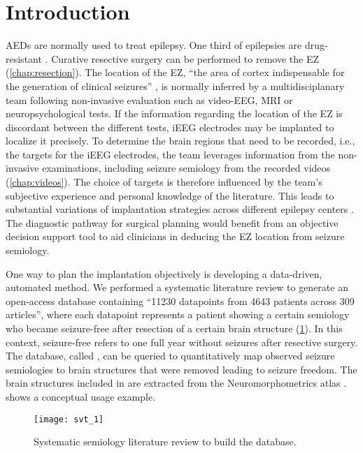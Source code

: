 \section{Introduction}

\Acp{AED} are normally used to treat epilepsy.
One third of epilepsies are drug-resistant \cite{engel_what_2016}.
Curative resective surgery can be performed to remove the \ac{EZ} (\cref{chap:resection}).
The location of the \ac{EZ}, ``the area of cortex indispensable for the generation of clinical seizures'' \cite{rosenow_presurgical_2001}, is normally inferred by a multidisciplanary team following non-invasive evaluation such as video-\ac{EEG}, \ac{MRI} or neuropsychological tests.
If the information regarding the location of the \ac{EZ} is discordant between the different tests, \ac{iEEG} electrodes may be implanted to localize it precisely.
To determine the brain regions that need to be recorded, i.e., the targets for the \ac{iEEG} electrodes, the team leverages information from the non-invasive examinations, including seizure semiology from the recorded videos (\cref{chap:videos}).
The choice of targets is therefore influenced by the team's subjective experience and personal knowledge of the literature.
This leads to substantial variations of implantation strategies across different epilepsy centers \cite{tufenkjian_seizure_2012}.
The diagnostic pathway for surgical planning would benefit from an objective decision support tool to aid clinicians in deducing the \ac{EZ} location from seizure semiology.

One way to plan the implantation objectively is developing a data-driven, automated method.
We performed a systematic literature review to generate an open-access database containing ``11230 datapoints from 4643 patients across 309 articles'', where each datapoint represents a patient showing a certain semiology who became seizure-free after resection of a certain brain structure \cite{alim-marvasti_probabilistic_2021} (\cref{fig:semiology_review}).
In this context, seizure-free refers to one full year without seizures after resective surgery.
The database, called \svtdatabase, can be queried to quantitatively map observed seizure semiologies to brain structures that were removed leading to seizure freedom.
The brain structures included in \svtdatabase are extracted from the Neuromorphometrics atlas%
.
 shows a conceptual usage example.

\begin{figure}
  \centering
  \texttt{[image: svt\_1]}
  \caption[Systematic semiology literature review to build the \svtdatabase database]{
    Systematic semiology literature review to build the \svtdatabase database.
  }\label{fig:semiology_review}
\end{figure}

